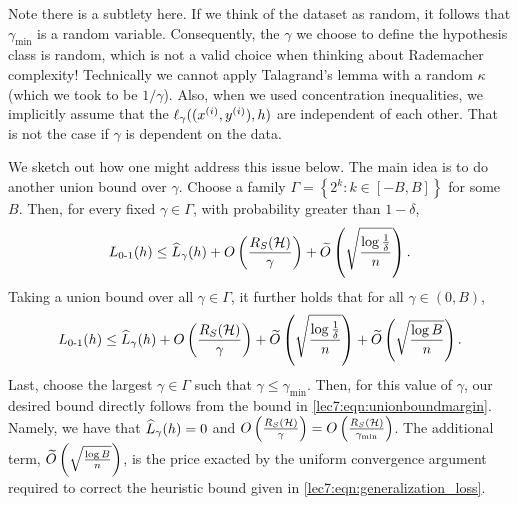 \begin{remark}
Note there is a subtlety here. If we think of the dataset as random, it follows that $\gamma_{\min}$ is a random variable. Consequently, the $\gamma$ we choose to define the hypothesis class is random, which is not a valid choice when thinking about Rademacher complexity! Technically we cannot apply Talagrand's lemma with a random $\kappa$ (which we took to be $1/\gamma$). Also, when we used concentration inequalities, we implicitly assume that the $\ell_\gamma((x\sp{i}, y\sp{i}), h)$ are independent of each other. That is not the case if $\gamma$ is dependent on the data.

We sketch out how one might address this issue below. The main idea is to do another union bound over $\gamma$. Choose a family $\Gamma = \left\{ 2^k: k \in [-B, B] \right\}$ for some $B$. Then, for every fixed $\gamma \in \Gamma$, with probability greater than $1 - \delta$,
\begin{align}
\Err(h) \leq \hatL_\gamma (h) + O \left( \frac{R_S(\cH)}{\gamma} \right) + \tilO \left( \sqrt{\frac{\log \frac{1}{\delta}}{n}} \right).
\end{align}
Taking a union bound over all $\gamma \in \Gamma$, it further holds that for all $\gamma \in (0, B)$, 
\begin{align}
    \Err(h) \leq \hatL_\gamma (h) + O \left( \frac{R_S(\cH)}{\gamma} \right) + \tilO \left( \sqrt{\frac{\log \frac{1}{\delta}}{n}}\right) + \tilO \left ( \sqrt{\frac{\log B}{n}} \right ). \label{lec7:eqn:unionboundmargin}
\end{align}
Last, choose the largest $\gamma \in \Gamma$ such that $\gamma \leq \gamma_{\min}$. Then, for this value of $\gamma$, our desired bound directly follows from the bound in \eqref{lec7:eqn:unionboundmargin}. Namely, we have that $\hatL_{\gamma} (h) = 0$ and $O \left( \frac{R_S(\cH)}{\gamma} \right) = O \left( \frac{R_S(\cH)}{\gamma_{\min}} \right)$. The additional term, $\tilO\left ( \sqrt{\frac{\log B}{n} }\right )$, is the price exacted by the uniform convergence argument required to correct the heuristic bound given in \eqref{lec7:eqn:generalization_loss}.

\end{remark}